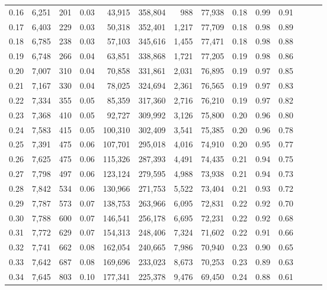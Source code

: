 \begin{tabular}{rrrrrrrrrrrrrr}
0.16 &  6,251 &    201 &  0.03 &   43,915 &  358,804 &     988 &  77,938 &  0.18 &  0.99 &      0.91 \\
0.17 &  6,403 &    229 &  0.03 &   50,318 &  352,401 &   1,217 &  77,709 &  0.18 &  0.98 &      0.89 \\
0.18 &  6,785 &    238 &  0.03 &   57,103 &  345,616 &   1,455 &  77,471 &  0.18 &  0.98 &      0.88 \\
0.19 &  6,748 &    266 &  0.04 &   63,851 &  338,868 &   1,721 &  77,205 &  0.19 &  0.98 &      0.86 \\
0.20 &  7,007 &    310 &  0.04 &   70,858 &  331,861 &   2,031 &  76,895 &  0.19 &  0.97 &      0.85 \\
0.21 &  7,167 &    330 &  0.04 &   78,025 &  324,694 &   2,361 &  76,565 &  0.19 &  0.97 &      0.83 \\
0.22 &  7,334 &    355 &  0.05 &   85,359 &  317,360 &   2,716 &  76,210 &  0.19 &  0.97 &      0.82 \\
0.23 &  7,368 &    410 &  0.05 &   92,727 &  309,992 &   3,126 &  75,800 &  0.20 &  0.96 &      0.80 \\
0.24 &  7,583 &    415 &  0.05 &  100,310 &  302,409 &   3,541 &  75,385 &  0.20 &  0.96 &      0.78 \\
0.25 &  7,391 &    475 &  0.06 &  107,701 &  295,018 &   4,016 &  74,910 &  0.20 &  0.95 &      0.77 \\
0.26 &  7,625 &    475 &  0.06 &  115,326 &  287,393 &   4,491 &  74,435 &  0.21 &  0.94 &      0.75 \\
0.27 &  7,798 &    497 &  0.06 &  123,124 &  279,595 &   4,988 &  73,938 &  0.21 &  0.94 &      0.73 \\
0.28 &  7,842 &    534 &  0.06 &  130,966 &  271,753 &   5,522 &  73,404 &  0.21 &  0.93 &      0.72 \\
0.29 &  7,787 &    573 &  0.07 &  138,753 &  263,966 &   6,095 &  72,831 &  0.22 &  0.92 &      0.70 \\
0.30 &  7,788 &    600 &  0.07 &  146,541 &  256,178 &   6,695 &  72,231 &  0.22 &  0.92 &      0.68 \\
0.31 &  7,772 &    629 &  0.07 &  154,313 &  248,406 &   7,324 &  71,602 &  0.22 &  0.91 &      0.66 \\
0.32 &  7,741 &    662 &  0.08 &  162,054 &  240,665 &   7,986 &  70,940 &  0.23 &  0.90 &      0.65 \\
0.33 &  7,642 &    687 &  0.08 &  169,696 &  233,023 &   8,673 &  70,253 &  0.23 &  0.89 &      0.63 \\
0.34 &  7,645 &    803 &  0.10 &  177,341 &  225,378 &   9,476 &  69,450 &  0.24 &  0.88 &      0.61 \\

\end{tabular}
